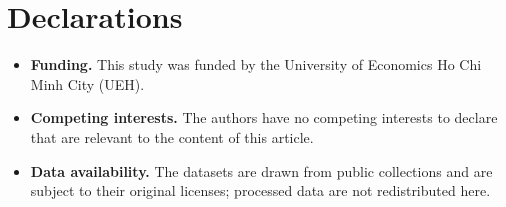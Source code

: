 \documentclass[pdflatex,sn-mathphys-num]{sn-jnl}
\begin{document}
\section*{Declarations}
\begin{itemize}
  \item \textbf{Funding.} This study was funded by the University of Economics
  Ho Chi Minh City (UEH).
  \item \textbf{Competing interests.} The authors have no competing interests
  to declare that are relevant to the content of this article.
  \item \textbf{Data availability.} The datasets are drawn from public
  collections and are subject to their original licenses; processed data are
  not redistributed here.
\end{itemize}
\end{document}
